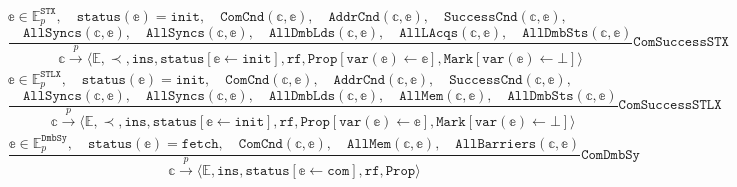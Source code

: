 \documentclass{article}
\newcommand{\var}{\texttt}
\begin{document}
$$\mathbb{e} \in \mathbb{E}_p^\var{STX}, \hspace{1em} \texttt{status}(\mathbb{e}) = \texttt{init}, \hspace{1em} \texttt{ComCnd}(\mathbb{c},\mathbb{e}),\hspace{1em} \var{AddrCnd}(\mathbb{c},\mathbb{e}), \hspace{1em} \var{SuccessCnd}(\mathbb{c},\mathbb{e}),$$
\vspace{-1.2em}$$\frac{\hspace{1em} \texttt{AllSyncs}(\mathbb{c},\mathbb{e}), \hspace{1em}\texttt{AllSyncs}(\mathbb{c},\mathbb{e}), \hspace{1em}\texttt{AllDmbLds}(\mathbb{c},\mathbb{e}), \hspace{1em} \texttt{AllLAcqs}(\mathbb{c},\mathbb{e}), \hspace{1em} \texttt{AllDmbSts}(\mathbb{c},\mathbb{e})}{\mathbb{c} \xrightarrow[]{p} \langle \mathbb{E}, \prec, \texttt{ins}, \texttt{status}[\mathbb{e} \leftarrow \texttt{init}], \texttt{rf}, \texttt{Prop}[\var{var}(\mathbb{e}) \gets \mathbb{e}], \var{Mark}[\var{var}(\mathbb{e}) \gets \bot]\rangle} \texttt{ComSuccessSTX}$$
$$\mathbb{e} \in \mathbb{E}_p^\var{STLX}, \hspace{1em} \texttt{status}(\mathbb{e}) = \texttt{init}, \hspace{1em} \texttt{ComCnd}(\mathbb{c},\mathbb{e}),\hspace{1em} \var{AddrCnd}(\mathbb{c},\mathbb{e}), \hspace{1em} \var{SuccessCnd}(\mathbb{c},\mathbb{e}),$$
\vspace{-1.2em}$$\frac{\hspace{1em} \texttt{AllSyncs}(\mathbb{c},\mathbb{e}), \hspace{1em}\texttt{AllSyncs}(\mathbb{c},\mathbb{e}), \hspace{1em}\texttt{AllDmbLds}(\mathbb{c},\mathbb{e}), \hspace{1em} \texttt{AllMem}(\mathbb{c},\mathbb{e}), \hspace{1em} \texttt{AllDmbSts}(\mathbb{c},\mathbb{e})}{\mathbb{c} \xrightarrow[]{p} \langle \mathbb{E}, \prec, \texttt{ins}, \texttt{status}[\mathbb{e} \leftarrow \texttt{init}], \texttt{rf}, \texttt{Prop}[\var{var}(\mathbb{e}) \gets \mathbb{e}], \var{Mark}[\var{var}(\mathbb{e}) \gets \bot]\rangle} \texttt{ComSuccessSTLX}$$
$$\frac{\mathbb{e} \in \mathbb{E}_p^\texttt{DmbSy}, \hspace{1em} \texttt{status}(\mathbb{e}) = \texttt{fetch}, \hspace{1em} \texttt{ComCnd}(\mathbb{c},\mathbb{e}), \hspace{1em} \texttt{AllMem}(\mathbb{c},\mathbb{e}), \hspace{1em} \texttt{AllBarriers}(\mathbb{c},\mathbb{e})}{\mathbb{c} \xrightarrow[]{p} \langle \mathbb{E}, \texttt{ins}, \texttt{status}[\mathbb{e} \leftarrow \texttt{com}], \texttt{rf}, \texttt{Prop}\rangle} \texttt{ComDmbSy} $$
\end{document}
